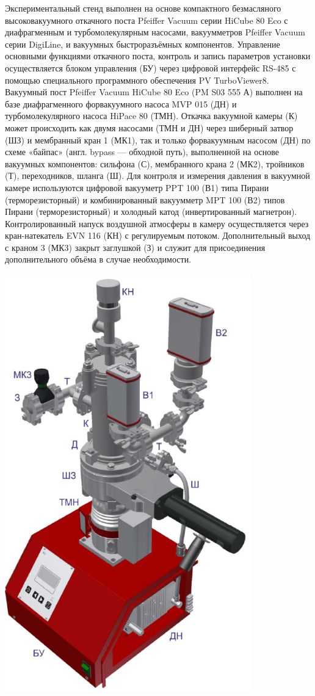 \documentclass[a4paper, 12pt]{article}%
\begin{document}
Экспериментальный стенд выполнен на основе компактного безмасляного высоковакуумного откачного поста Pfeiffer Vacuum серии HiCube 80 Eco с диафрагменным и турбомолекулярным насосами, вакуумметров Pfeiffer Vacuum серии DigiLine, и вакуумных быстроразъёмных компонентов. Управление основными функциями откачного поста, контроль и запись параметров установки осуществляется блоком управления (БУ) через цифровой интерфейс RS-485 с помощью специального программного обеспечения PV TurboViewer8.
Вакуумный пост Pfeiffer Vacuum HiCube 80 Eco (PM S03 555 А) выполнен на базе диафрагменного форвакуумного насоса MVP 015 (ДН) и турбомолекулярного насоса HiPace 80 (ТМН). Откачка вакуумной камеры (К) может происходить как двумя насосами (ТМН и ДН) через шиберный затвор (ШЗ) и мембранный кран 1 (МК1), так и только форвакуумным насосом (ДН) по схеме «байпас» (англ. bypass — обходной путь), выполненной на основе вакуумных компонентов: сильфона (С), мембранного крана 2 (МК2), тройников (Т), переходников, шланга (Ш). Для контроля и измерения давления в вакуумной камере используются цифровой вакууметр PPT 100 (В1) типа Пирани (терморезисторный) и комбинированный вакуумметр MPT 100 (В2) типов Пирани (терморезисторный) и холодный катод (инвертированный магнетрон). Контролированный напуск воздушной атмосферы в камеру осуществляется через кран-натекатель EVN 116 (КН) с регулируемым потоком. Дополнительный выход с краном 3 (МК3) закрыт заглушкой (З) и служит для присоединения дополнительного объёма в случае необходимости.

\includegraphics[width = 0.8\textwidth]{231_2.png}
\end{document}
